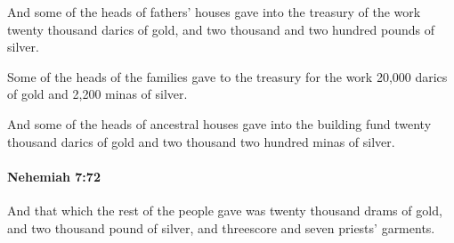 			\begin{versebox}
					\item[BHS] 
					\item[LXX] 
					\item[ASV] And some of the heads of fathers' houses gave into the treasury of the work twenty thousand darics of gold, and two thousand and two hundred pounds of silver.
					\item[NIV] Some of the heads of the families gave to the treasury for the work 20,000 darics of gold and 2,200 minas of silver.
					\item[NRSV] And some of the heads of ancestral houses gave into the building fund twenty thousand darics of gold and two thousand two hundred minas of silver.
			\end{versebox}

		\paragraph{Nehemiah 7:72} %
			\label{NEHEMIAH-7-72}

			And that which the rest of the people gave was twenty thousand drams of gold, and two thousand pound of silver, and threescore and seven priests’ garments.

